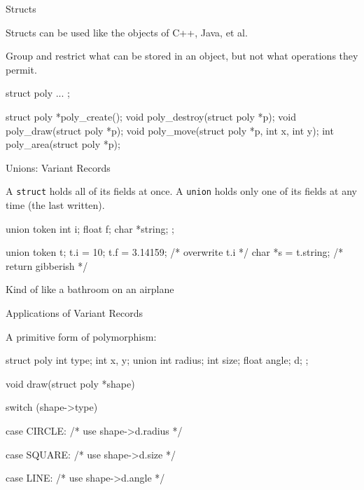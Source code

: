 \documentclass{plt}
\begin{document}
\begin{frame}[fragile]{Structs}

Structs can be used like the objects of C++, Java, et al.

Group and restrict what can be stored in an object, but not what
operations they permit.

\begin{C}
struct poly { ... };

struct poly *poly_create();
void         poly_destroy(struct poly *p);
void         poly_draw(struct poly *p);
void         poly_move(struct poly *p, int x, int y);
int          poly_area(struct poly *p);
\end{C}

\end{frame}

\begin{frame}[fragile]{Unions: Variant Records}

A \texttt{struct} holds all of its fields at once.  A \texttt{union}
holds only one of its fields at any time (the last written).

\begin{C}
union token {
  int i;
  float f;
  char *string;
};

union token t;
t.i = 10;
t.f = 3.14159;       /* overwrite t.i */
char *s = t.string;  /* return gibberish */
\end{C}

Kind of like a bathroom on an airplane

\end{frame}

\begin{frame}[fragile]{Applications of Variant Records}

A primitive form of polymorphism:

\begin{C}
struct poly {
  int type;
  int x, y;
  union { int radius;
          int size;
          float angle; } d;
};

void draw(struct poly *shape)
{
  switch (shape->type) {
  case CIRCLE:  /* use shape->d.radius */

  case SQUARE:  /* use shape->d.size */

  case LINE:    /* use shape->d.angle */

  }

}
\end{C}

\end{frame}
\end{document}
